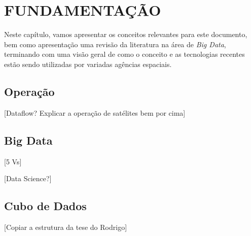 
\chapter{FUNDAMENTAÇÃO}
\label{ch:fun}

Neste capítulo, vamos apresentar os conceitos relevantes para este documento, bem como apresentação uma revisão da literatura na área de \textit{Big Data}, terminando com uma visão geral de como o conceito e as tecnologias recentes estão sendo utilizadas por variadas agências espaciais.

\section{Operação}
\label{ch:fun:operations}

[Dataflow? Explicar a operação de satélites bem por cima]

\section{Big Data}
\label{ch:fun:bigdata}

[5 Vs]

[Data Science?]

\section{Cubo de Dados}
\label{ch:fun:cube}

[Copiar a estrutura da tese do Rodrigo]

